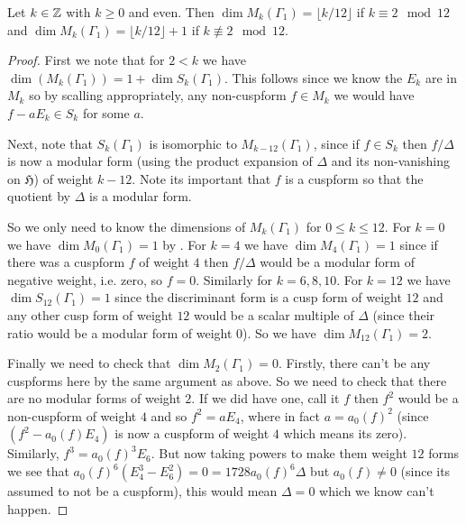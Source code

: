 \begin{theorem}\label{thm:lvl1_dims}\leanok
    Let $k \in \mathbb{Z}$ with $k \ge 0$ and even. Then $\dim M_k(\Gamma_1) = \lfloor k / 12 \rfloor $ if $k \equiv 2 \mod 12$ and $\dim M_k(\Gamma_1) = \lfloor k / 12 \rfloor + 1$ if $k \not\equiv 2 \mod 12$.
\end{theorem}
\begin{proof}
\leanok
First we note that for $2 < k$ we have $\dim(M_k(\Gamma_1)) = 1 + \dim S_k(\Gamma_1)$. This follows since we know the $E_k$ are in $M_k$ so by scalling appropriately, any non-cuspform $f \in M_k$ we would have $f - a E_k \in S_k$ for some $a$.

Next, note that  $S_k(\Gamma_1)$ is isomorphic to $M_{k-12}(\Gamma_1)$, since if $f \in S_k$ then $f/ \Delta$ is now a modular form (using the product expansion of $\Delta$ and its non-vanishing on $\mathfrak{H}$) of weight $k-12$. Note its important that $f$ is a cuspform so that the quotient by $\Delta$ is a modular form.

So we only need to know the dimensions of $M_k(\Gamma_1)$ for $0 \le k \le 12$. For $k = 0$ we have $\dim M_0(\Gamma_1) = 1$ by .  For $k = 4$ we have $\dim M_4(\Gamma_1) = 1$ since if there was a cuspform $f$ of weight $4$ then $f/ \Delta$ would be a modular form of negative weight, i.e. zero, so $f=0$. Similarly for $k=6,8,10$. For $k=12$ we have $\dim S_{12}(\Gamma_1) = 1$ since the discriminant form is a cusp form of weight $12$ and any other cusp form of weight $12$ would be a scalar multiple of $\Delta$ (since their ratio would be a modular form of weight $0$). So we have $\dim M_{12}(\Gamma_1) = 2$.

Finally we need to check that $\dim M_2(\Gamma_1) = 0$. Firstly, there can't be any cuspforms here by the same argument as above. So we need to check that there are no modular forms of weight $2$. If we did have one, call it $f$ then $f^2$ would be a non-cuspform of weight $4$ and so $f^2 = a E_4$, where in fact $a=a_0(f)^2$ (since $(f^2-a_0(f)E_4)$ is now a cuspform of weight $4$ which means its zero). Similarly, $f^3 = a_0(f)^3 E_6$. But now taking powers to make them weight $12$ forms we see that $a_0(f)^6(E_4^3 - E_6^2) = 0 = 1728 a_0(f)^6 \Delta$
but $a_0(f) \ne 0$ (since its assumed to not be a cuspform), this would mean $\Delta =0$ which we know can't happen.


\end{proof}

